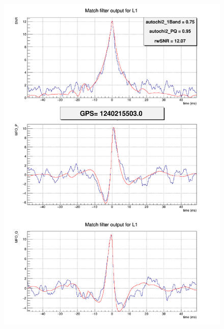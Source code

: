 %
\begin{figure}[ht]
  \centering
  \begin{minipage}{0.45\linewidth}
    \centering
    \includegraphics[width=\linewidth]{sectionMBTA/mfoAstro.png}
  \end{minipage}
  \hfill
  \begin{minipage}{0.45\linewidth}
    \centering

\end{minipage}
\end{figure}
